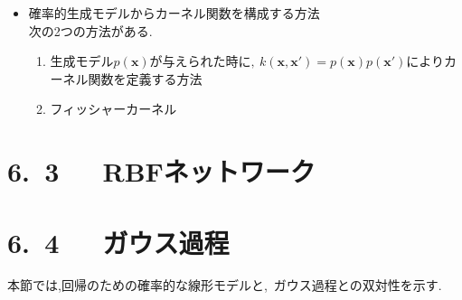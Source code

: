 \documentclass[11pt,a4paper]{jreport}
\begin{document}
\begin{itemize}
\begin{itembox}[l]{新たなカーネルを構成する方法}
\begin{eqnarray*}
    k(\textbf{x},\textbf{x}')&=&q(k_1(\textbf{x},\textbf{x}'))\\
    k(\textbf{x},\textbf{x}')&=&exp(k_1(\textbf{x},\textbf{x}'))\\
    k(\textbf{x},\textbf{x}')&=&k_1(\textbf{x},\textbf{x}') + k_2(\textbf{x},\textbf{x}')\\
    k(\textbf{x},\textbf{x}')&=&k_1(\textbf{x},\textbf{x}')k_2(\textbf{x},\textbf{x}')\\
    k(\textbf{x},\textbf{x}')&=&k_3(\bf{\phi}(\textbf{x}),\bf{\phi}(\textbf{x}'))\\
    k(\textbf{x},\textbf{x}')&=&\textbf{x}^T\textbf{A}\textbf{x}'\\
    k(\textbf{x},\textbf{x}')&=&k_a(\textbf{x}_a,\textbf{x}'_a) + k_b(\textbf{x}_b,\textbf{x}'_b)\\
    k(\textbf{x},\textbf{x}')&=&k_a(\textbf{x}_a,\textbf{x}'_a)k_b(\textbf{x}_b,\textbf{x}'_b)\\
  \end{eqnarray*}
  \end{itembox}
  構成要素としてよく使われるカーネル関数には,~以下の2つがある.\\
  \begin{enumerate}
    \item 多項式カーネル
    \begin{equation}
      k(\textbf{x},\textbf{x}')=(\textbf{x}^T\textbf{x}')^M
    \end{equation}
    \item ガウスカーネル
    \begin{equation}
      k(\textbf{x},\textbf{x}')=exp(-\|\textbf{x}-\textbf{x}'\|^2/2\sigma^2)
    \end{equation}
  \end{enumerate}
  \item 確率的生成モデルからカーネル関数を構成する方法\\
  次の2つの方法がある.
  \begin{enumerate}
    \item 生成モデル$p(\textbf{x})が与えられた時に,~k(\textbf{x},\textbf{x}')=p(\textbf{x})p(\textbf{x}')$によりカーネル関数を定義する方法
    \item フィッシャーカーネル

  \end{enumerate}
\end{itemize}
\section*{6.~3~~~RBFネットワーク}

\section*{6.~4~~~ガウス過程}
本節では,回帰のための確率的な線形モデルと,~ガウス過程との双対性を示す.
\end{document}
